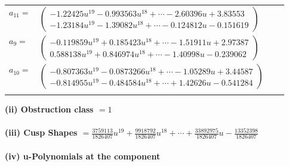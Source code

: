 \documentclass[1p]{elsarticle_modified}
\theoremstyle{definition}
\begin{document}
\begin{tabular}{m{7pt} m{180pt} m{7pt} m{180pt} }
\flushright $a_{11}=$&$\begin{pmatrix}-1.22425 u^{19}-0.993563 u^{18}+\cdots-2.60396 u+3.83553\\-1.23184 u^{19}-1.39082 u^{18}+\cdots-0.124812 u-0.151619\end{pmatrix}$ \\
\flushright $a_{9}=$&$\begin{pmatrix}-0.119859 u^{19}+0.185423 u^{18}+\cdots-1.51911 u+2.97387\\0.588138 u^{19}+0.846974 u^{18}+\cdots-1.40998 u-0.239062\end{pmatrix}$ \\
\flushright $a_{10}=$&$\begin{pmatrix}-0.807363 u^{19}-0.0873266 u^{18}+\cdots-1.05289 u+3.44587\\-0.814955 u^{19}-0.484584 u^{18}+\cdots+1.42626 u-0.541284\end{pmatrix}$\\&\end{tabular}
\flushleft \textbf{(ii) Obstruction class $= 1$}\\~\\
\flushleft \textbf{(iii) Cusp Shapes $= \frac{3759113}{1826407} u^{19}+\frac{9918792}{1826407} u^{18}+\cdots+\frac{33892975}{1826407} u-\frac{13352398}{1826407}$}\\~\\
\newpage\renewcommand{\arraystretch}{1}
\flushleft \textbf{(iv) u-Polynomials at the component}\newline \\
\end{document}
